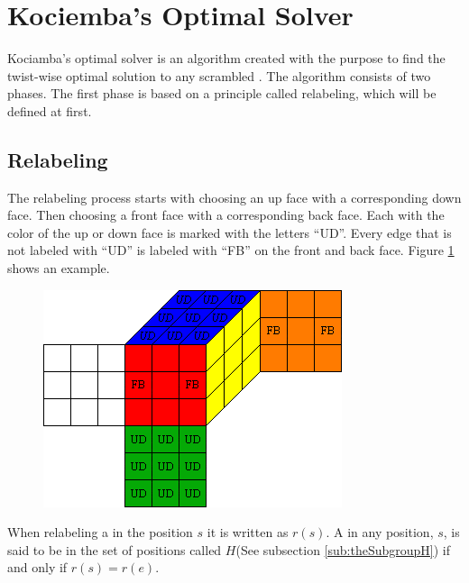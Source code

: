 \section{Kociemba's Optimal Solver}
Kociamba's optimal solver is an algorithm created with the purpose to find the twist-wise optimal solution to any scrambled \rubik{}\cite{kociemba09} \cite{cubelovers92}. The algorithm consists of two phases. The first phase is based on a principle called relabeling, which will be defined at first. 


\subsection{Relabeling}
The relabeling process  starts with choosing an up face with a corresponding down face. Then choosing a front face with a corresponding back face. Each \facelet{} with the color of the up or down face is marked with the letters ``UD''.  %
Every edge \cpiece{} that is not labeled with "`UD"' is labeled with "`FB"' on the front and back face.
Figure \ref{fig:relabelClean} shows an example.
\begin{figure}[hb]
	\centering
		\includegraphics[scale = 0.8]{input/pics/relabelClean}
	\caption{}
	\label{fig:relabelClean}
\end{figure}
When relabeling a \rubik{} in the position $s$ it is written as $r(s)$. A \rubik{} in any position, $s$, is said to be in the set of positions called $H$(See subsection \ref{sub:theSubgroupH}) if and only if $r(s)=r(e)$.

